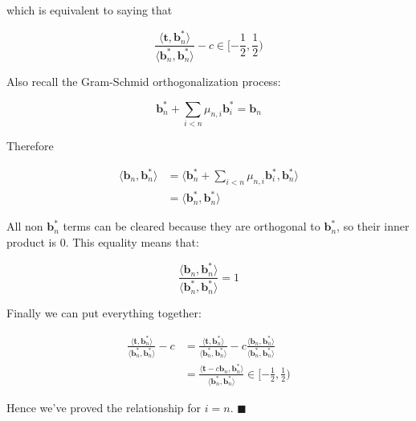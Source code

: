which is equivalent to saying that

$$
\frac{
    \langle\mathbf{t}, \mathbf{b}_n^\ast\rangle
}{
    \langle\mathbf{b}_n^\ast, \mathbf{b}_n^\ast\rangle
}
- c \in [-\frac{1}{2}, \frac{1}{2})
$$

Also recall the Gram-Schmid orthogonalization process:

$$
\mathbf{b}_n^\ast +\sum_{i<n}\mu_{n, i}\mathbf{b}_i^\ast = \mathbf{b}_n
$$

Therefore

$$
\begin{aligned}
\langle\mathbf{b}_n, \mathbf{b}_n^\ast\rangle
&= \langle 
    \mathbf{b}_n^\ast +\sum_{i<n}\mu_{n, i}\mathbf{b}_i^\ast, \mathbf{b}_n^\ast
\rangle \\
&= \langle\mathbf{b}_n^\ast, \mathbf{b}_n^\ast\rangle
\end{aligned}
$$

All non $\mathbf{b}_n^\ast$ terms can be cleared because they are orthogonal to $\mathbf{b}_n^\ast$, so their inner product is 0. This equality means that:

$$
\frac{
    \langle\mathbf{b}_n, \mathbf{b}_n^\ast\rangle
}{
    \langle\mathbf{b}_n^\ast, \mathbf{b}_n^\ast\rangle
} = 1
$$

Finally we can put everything together:

$$
\begin{aligned}
\frac{
    \langle\mathbf{t}, \mathbf{b}_n^\ast\rangle
}{
    \langle\mathbf{b}_n^\ast, \mathbf{b}_n^\ast\rangle
}
- c 
&= \frac{
    \langle\mathbf{t}, \mathbf{b}_n^\ast\rangle
}{
    \langle\mathbf{b}_n^\ast, \mathbf{b}_n^\ast\rangle
}
- c \frac{
    \langle\mathbf{b}_n, \mathbf{b}_n^\ast\rangle
}{
    \langle\mathbf{b}_n^\ast, \mathbf{b}_n^\ast\rangle
} \\
&= \frac{
    \langle\mathbf{t} - c\mathbf{b}_n, \mathbf{b}_n^\ast\rangle
}{
    \langle\mathbf{b}_n^\ast, \mathbf{b}_n^\ast\rangle
}
\in [-\frac{1}{2}, \frac{1}{2})
\end{aligned}
$$

Hence we've proved the relationship for $i = n$. $\blacksquare$